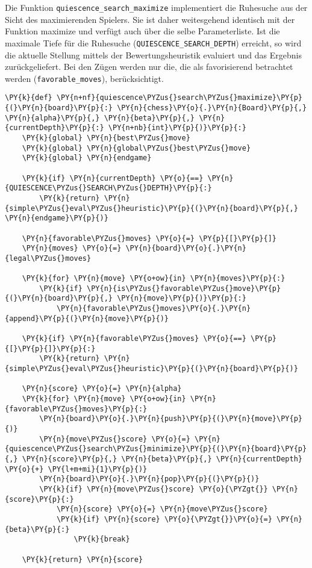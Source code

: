     Die Funktion \texttt{quiescence\_search\_maximize} implementiert die
Ruhesuche aus der Sicht des maximierenden Spielers. Sie ist daher
weitesgehend identisch mit der Funktion maximize und verfügt auch über
die selbe Parameterliste. Ist die maximale Tiefe für die Ruhesuche
(\texttt{QUIESCENCE\_SEARCH\_DEPTH}) erreicht, so wird die aktuelle
Stellung mittels der Bewertungsheuristik evaluiert und das Ergebnis
zurückgeliefert. Bei den Zügen werden nur die, die als favorisierend
betrachtet werden (\texttt{favorable\_moves}), berücksichtigt.

\bigskip

    \begin{tcolorbox}[fontupper=\linespread{.66}\selectfont, breakable, size=fbox, boxrule=1pt, pad at break*=1mm,colback=cellbackground, colframe=cellborder]
\begin{Verbatim}[commandchars=\\\{\}]
\PY{k}{def} \PY{n+nf}{quiescence\PYZus{}search\PYZus{}maximize}\PY{p}{(}\PY{n}{board}\PY{p}{:} \PY{n}{chess}\PY{o}{.}\PY{n}{Board}\PY{p}{,} \PY{n}{alpha}\PY{p}{,} \PY{n}{beta}\PY{p}{,} \PY{n}{currentDepth}\PY{p}{:} \PY{n+nb}{int}\PY{p}{)}\PY{p}{:}
    \PY{k}{global} \PY{n}{best\PYZus{}move}
    \PY{k}{global} \PY{n}{global\PYZus{}best\PYZus{}move}
    \PY{k}{global} \PY{n}{endgame}

    \PY{k}{if} \PY{n}{currentDepth} \PY{o}{==} \PY{n}{QUIESCENCE\PYZus{}SEARCH\PYZus{}DEPTH}\PY{p}{:}
        \PY{k}{return} \PY{n}{simple\PYZus{}eval\PYZus{}heuristic}\PY{p}{(}\PY{n}{board}\PY{p}{,} \PY{n}{endgame}\PY{p}{)}

    \PY{n}{favorable\PYZus{}moves} \PY{o}{=} \PY{p}{[}\PY{p}{]}
    \PY{n}{moves} \PY{o}{=} \PY{n}{board}\PY{o}{.}\PY{n}{legal\PYZus{}moves}

    \PY{k}{for} \PY{n}{move} \PY{o+ow}{in} \PY{n}{moves}\PY{p}{:}
        \PY{k}{if} \PY{n}{is\PYZus{}favorable\PYZus{}move}\PY{p}{(}\PY{n}{board}\PY{p}{,} \PY{n}{move}\PY{p}{)}\PY{p}{:}
            \PY{n}{favorable\PYZus{}moves}\PY{o}{.}\PY{n}{append}\PY{p}{(}\PY{n}{move}\PY{p}{)}

    \PY{k}{if} \PY{n}{favorable\PYZus{}moves} \PY{o}{==} \PY{p}{[}\PY{p}{]}\PY{p}{:}
        \PY{k}{return} \PY{n}{simple\PYZus{}eval\PYZus{}heuristic}\PY{p}{(}\PY{n}{board}\PY{p}{)}

    \PY{n}{score} \PY{o}{=} \PY{n}{alpha}
    \PY{k}{for} \PY{n}{move} \PY{o+ow}{in} \PY{n}{favorable\PYZus{}moves}\PY{p}{:}
        \PY{n}{board}\PY{o}{.}\PY{n}{push}\PY{p}{(}\PY{n}{move}\PY{p}{)}
        \PY{n}{move\PYZus{}score} \PY{o}{=} \PY{n}{quiescence\PYZus{}search\PYZus{}minimize}\PY{p}{(}\PY{n}{board}\PY{p}{,} \PY{n}{score}\PY{p}{,} \PY{n}{beta}\PY{p}{,} \PY{n}{currentDepth} \PY{o}{+} \PY{l+m+mi}{1}\PY{p}{)}
        \PY{n}{board}\PY{o}{.}\PY{n}{pop}\PY{p}{(}\PY{p}{)}
        \PY{k}{if} \PY{n}{move\PYZus{}score} \PY{o}{\PYZgt{}} \PY{n}{score}\PY{p}{:}
            \PY{n}{score} \PY{o}{=} \PY{n}{move\PYZus{}score}
            \PY{k}{if} \PY{n}{score} \PY{o}{\PYZgt{}}\PY{o}{=} \PY{n}{beta}\PY{p}{:}
                \PY{k}{break}

    \PY{k}{return} \PY{n}{score}
\end{Verbatim}
\end{tcolorbox}

